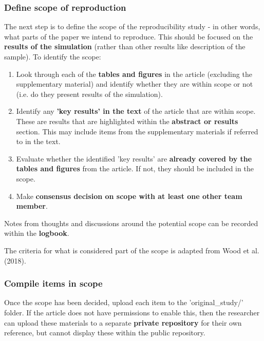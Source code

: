 \subsubsection{Define scope of reproduction}

The next step is to define the scope of the reproducibility study - in other words, what parts of the paper we intend to reproduce. This should be focused on the \textbf{results of the simulation} (rather than other results like description of the sample). To identify the scope:

\begin{enumerate}
    \item Look through each of the \textbf{tables and figures} in the article (excluding the supplementary material) and identify whether they are within scope or not (i.e. do they present results of the simulation).
    \item Identify any \textbf{'key results' in the text} of the article that are within scope. These are results that are highlighted within the \textbf{abstract or results} section. This may include items from the supplementary materials if referred to in the text.
    \item Evaluate whether the identified 'key results' are \textbf{already covered by the tables and figures} from the article. If not, they should be included in the scope.
    \item Make \textbf{consensus decision on scope with at least one other team member}.
\end{enumerate}

Notes from thoughts and discussions around the potential scope can be recorded within the \textbf{logbook}.

The criteria for what is considered part of the scope is adapted from Wood et al. (2018).\autocite{wood_replication_2018, wood_push_2018}

\vspace{0.5cm}
\subsubsection{Compile items in scope}

Once the scope has been decided, upload each item to the 'original\_study/' folder. If the article does not have permissions to enable this, then the researcher can upload these materials to a separate \textbf{private repository} for their own reference, but cannot display these within the public repository.

